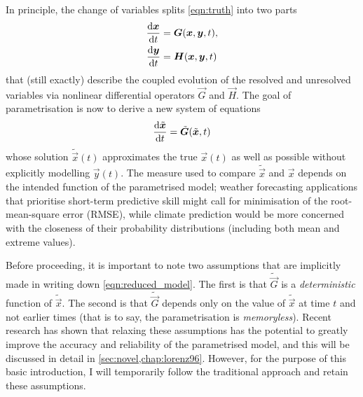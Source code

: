 \documentclass[../main.tex]{subfiles}
\begin{document}
In principle, the change of variables splits \cref{eqn:truth}
into two parts
\begin{align*}
    \frac{\mathrm{d} \bm{x}}{\mathrm{d} t} &= \bm{G}(\bm{x},\bm{y},t), \\
    \frac{\mathrm{d} \bm{y}}{\mathrm{d} t} &= \bm{H}(\bm{x},\bm{y},t)
\end{align*}
that (still exactly) describe the coupled evolution of the resolved and
unresolved variables via nonlinear differential operators $\vec{G}$ and
$\vec{H}$. The goal of parametrisation is now to derive a new system of
equations
\begin{equation} \label{eqn:reduced_model}
    \frac{\mathrm{d} \tilde{\bm{x}}}{\mathrm{d} t} = \tilde{\bm{G}}(\tilde{\bm{x}},t)
\end{equation}
whose solution $\tilde{\vec{x}}(t)$ approximates the true $\vec{x}(t)$ as well
as possible without explicitly modelling $\vec{y}(t)$. The measure used to
compare $\tilde{\vec{x}}$ and $\vec{x}$ depends on the intended function of the
parametrised model; weather forecasting applications that prioritise short-term
predictive skill might call for minimisation of the root-mean-square error
(RMSE), while climate prediction would be more concerned with the closeness of
their probability distributions (including both mean and extreme values).

Before proceeding, it is important to note two assumptions that are implicitly
made in writing down \cref{eqn:reduced_model}. The first is that
$\tilde{\vec{G}}$ is a \emph{deterministic} function of $\tilde{\vec{x}}$. The
second is that $\tilde{\vec{G}}$ depends only on the value of $\tilde{\vec{x}}$
at time $t$ and not earlier times (that is to say, the parametrisation is
\emph{memoryless}). Recent research has shown that relaxing these assumptions
has the potential to greatly improve the accuracy and reliability of the
parametrised model, and this will be discussed in detail in
\cref{sec:novel,chap:lorenz96}. However, for the purpose of this basic
introduction, I will temporarily follow the traditional approach and retain
these assumptions.
\end{document}

